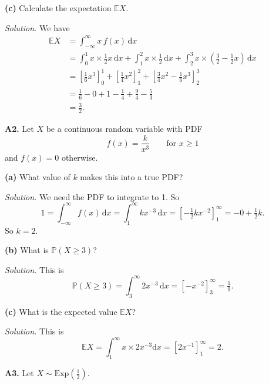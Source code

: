 \documentclass[
  a4paper,
]{book}
\theoremstyle{definition}
\theoremstyle{definition}
\theoremstyle{definition}
\theoremstyle{definition}
\theoremstyle{remark}
\begin{document}
\textbf{(c)} Calculate the expectation \(\mathbb EX\).

\begin{myanswers}
\emph{Solution.}
We have
\begin{align*}
\mathbb EX &= \int_{-\infty}^{\infty} x\,f(x)\, \mathrm dx \\
  &= \int_0^1 x\times\tfrac12x\, \mathrm dx + \int_1^2 x \times \tfrac12 \, \mathrm dx + \int_2^3 x \times \left(\tfrac32 - \tfrac12 x\right)\, \mathrm dx \\
  &= \left[\tfrac16 x^3 \right]_0^1 + \left[\tfrac14 x^2 \right]_1^2 + \left[\tfrac34 x^2 - \tfrac16 x^3 \right]_2^3 \\
  &= \tfrac16 - 0 + 1 - \tfrac14 + \tfrac94 - \tfrac53 \\
  &= \tfrac32 .
\end{align*}

\end{myanswers}

\textbf{A2.} Let \(X\) be a continuous random variable with PDF
\[ f(x) = \frac{k}{x^3} \qquad \text{for $x \geq 1$} \]
and \(f(x) = 0\) otherwise.

\textbf{(a)} What value of \(k\) makes this into a true PDF?

\begin{myanswers}
\emph{Solution.} We need the PDF to integrate to 1. So
\[ 1 = \int_{-\infty}^\infty f(x) \, \mathrm dx = \int_1^\infty kx^{-3} \, \mathrm dx = \left[-\tfrac 12 kx^{-2}\right]_1^\infty = - 0 + \tfrac12k . \]
So \(k = 2\).

\end{myanswers}

\textbf{(b)} What is \(\mathbb P(X \geq 3)\)?

\begin{myanswers}
\emph{Solution.} This is
\[ \mathbb P(X \geq 3) = \int_3^\infty 2x^{-3}\,\mathrm dx = \left[-x^{-2}\right]_3^\infty = \tfrac19 .  \]

\end{myanswers}

\textbf{(c)} What is the expected value \(\mathbb EX\)?

\begin{myanswers}
\emph{Solution.} This is
\[ \mathbb EX = \int_1^\infty x\times 2x^{-3} \mathrm dx = \left[2x^{-1}\right]_1^\infty = 2 . \]

\end{myanswers}

\textbf{A3.} Let \(X \sim \text{Exp}(\frac12)\).
\end{document}
